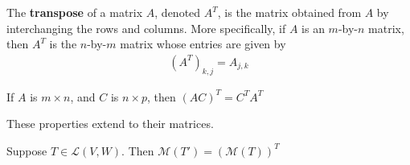 \documentclass{memoir}
\begin{document}
\begin{defn}[Transpose]
The \textbf{transpose} of a matrix $A$, denoted $A^{T}$, is the matrix obtained from $A$ by interchanging the rows and columns. More specifically, if $A$ is an $m$-by-$n$ matrix, then $A^{T}$ is the $n$-by-$m$ matrix whose entries are given by
\begin{align*}
	(A^{T})_{k,j} = A_{j,k}
\end{align*}
\end{defn}
\begin{cor}
	If $A$ is $m\times n$, and $C$ is $n\times p$, then $(AC)^{T} = C^{T}A^{T}$
\end{cor}
These properties extend to their matrices.
\begin{thm}
	Suppose $T \in \mathcal{L}(V,W)$. Then $\mathcal{M}(T') = (\mathcal{M}(T))^{T}$
\end{thm}
\end{document}
